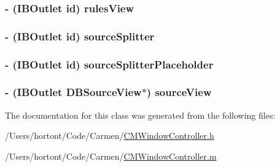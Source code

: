 \hypertarget{interface_c_m_window_controller_dd05105cac35dbf0b02c10086e183fdd}{
\subsubsection[rulesView]{\setlength{\rightskip}{0pt plus 5cm}- (IBOutlet id) {\bf rulesView}}}
\label{interface_c_m_window_controller_dd05105cac35dbf0b02c10086e183fdd}


\hypertarget{interface_c_m_window_controller_e1c749543503661c7956761c6f10b95f}{
\subsubsection[sourceSplitter]{\setlength{\rightskip}{0pt plus 5cm}- (IBOutlet id) {\bf sourceSplitter}}}
\label{interface_c_m_window_controller_e1c749543503661c7956761c6f10b95f}


\hypertarget{interface_c_m_window_controller_7c3e1c39774afa7401869ed51460e7c3}{
\subsubsection[sourceSplitterPlaceholder]{\setlength{\rightskip}{0pt plus 5cm}- (IBOutlet id) {\bf sourceSplitterPlaceholder}}}
\label{interface_c_m_window_controller_7c3e1c39774afa7401869ed51460e7c3}


\hypertarget{interface_c_m_window_controller_0534aae4f0512cb2da96464157f04b75}{
\subsubsection[sourceView]{\setlength{\rightskip}{0pt plus 5cm}- (IBOutlet DBSourceView$\ast$) {\bf sourceView}}}
\label{interface_c_m_window_controller_0534aae4f0512cb2da96464157f04b75}




The documentation for this class was generated from the following files:\begin{CompactItemize}
\item 
/Users/hortont/Code/Carmen/\hyperlink{_c_m_window_controller_8h}{CMWindowController.h}\item 
/Users/hortont/Code/Carmen/\hyperlink{_c_m_window_controller_8m}{CMWindowController.m}\end{CompactItemize}

